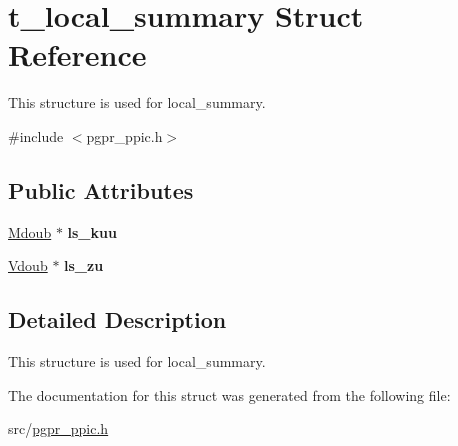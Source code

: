 \hypertarget{structt__local__summary}{\section{t\-\_\-local\-\_\-summary Struct Reference}
\label{structt__local__summary}
}


This structure is used for local\-\_\-summary.  




{\ttfamily \#include $<$pgpr\-\_\-ppic.\-h$>$}

\subsection*{Public Attributes}
\begin{DoxyCompactItemize}
\item 
\hypertarget{structt__local__summary_a1318913867d7317489969f83621411bd}{\hyperlink{classpgpr__matrix}{Mdoub} $\ast$ {\bfseries ls\-\_\-kuu}}\label{structt__local__summary_a1318913867d7317489969f83621411bd}

\item 
\hypertarget{structt__local__summary_a7d397256f86a2c4be8598492b1e2d296}{\hyperlink{classpgpr__vector}{Vdoub} $\ast$ {\bfseries ls\-\_\-zu}}\label{structt__local__summary_a7d397256f86a2c4be8598492b1e2d296}

\end{DoxyCompactItemize}


\subsection{Detailed Description}
This structure is used for local\-\_\-summary. 

The documentation for this struct was generated from the following file\-:\begin{DoxyCompactItemize}
\item 
src/\hyperlink{pgpr__ppic_8h}{pgpr\-\_\-ppic.\-h}\end{DoxyCompactItemize}
